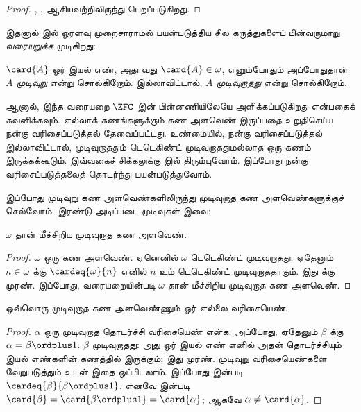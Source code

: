 \documentclass[../../../include/open-logic-section]{subfiles}
\begin{document}
\begin{proof}
,
,
 ஆகியவற்றிலிருந்து பெறப்படுகிறது.
\end{proof}

இதனால்  இல் ஓரளவு முறைசாராமல் பயன்படுத்திய
சில கருத்துகளைப் பின்வருமாறு \emph{வரையறுக்க} முடிகிறது:

\begin{defn}
$\card{A}$ ஓர் இயல் எண், அதாவது $\card{A} \in \omega$,
எனும்போதும் அப்போதுதான் $A$ \emph{முடிவுறு} என்று சொல்கிறோம்.
இல்லாவிட்டால், $A$ \emph{முடிவுறாதது} என்று சொல்கிறோம்.
\end{defn}
\noindent
ஆனால், இந்த வரையறை $\ZFC$ இன் பின்னணியிலேயே அளிக்கப்படுகிறது
என்பதைக் கவனிக்கவும். எல்லாக் கணங்களுக்கும் கண அளவெண் இருப்பதை
உறுதிசெய்ய நன்கு வரிசைப்படுத்தல் தேவைப்பட்டது. உண்மையில், நன்கு
வரிசைப்படுத்தல் இல்லாவிட்டால், முடிவுறாததும் டெடெகிண்ட்
முடிவுறாததுமல்லாத ஒரு கணம் இருக்கக்கூடும். இவ்வகைச் சிக்கலுக்கு
 இல் திரும்புவோம். இப்போது நன்கு
வரிசைப்படுத்தலைத் தொடர்ந்து பயன்படுத்துவோம்.

இப்போது முடிவுறு கண அளவெண்களிலிருந்து முடிவுறாத கண அளவெண்களுக்குச்
செல்வோம். இரண்டு அடிப்படை முடிவுகள் இவை:

\begin{cor}
$\omega$ தான் மீச்சிறிய முடிவுறாத கண அளவெண்.
\end{cor}

\begin{proof}
$\omega$ ஒரு கண அளவெண். ஏனெனில் $\omega$ டெடெகிண்ட்
முடிவுறாதது; ஏதேனும் $n \in \omega$ க்கு
$\cardeq{\omega}{n}$ எனில் $n$ உம் டெடெகிண்ட் முடிவுறாததாகும்.
இது  க்கு முரண்.
இப்போது, வரையறையின்படி $\omega$ தான் மீச்சிறிய முடிவுறாத கண அளவெண்.
\end{proof}

\begin{cor}
ஒவ்வொரு முடிவுறாத கண அளவெண்ணும் ஓர் எல்லை வரிசையெண்.
\end{cor}

\begin{proof}
$\alpha$ ஒரு முடிவுறாத தொடர்ச்சி வரிசையெண் என்க. அப்போது,
ஏதேனும் $\beta$ க்கு $\alpha = \beta \ordplus 1$.
$\beta$ முடிவுறாதது: அது ஓர் இயல் எண் எனில் அதன்
தொடர்ச்சியும் இயல் எண்களின் கணத்தில் இருக்கும்; இது முரண். முடிவுறு
வரிசையெண்களை வேறுபடுத்தும்  உடன் இதை
ஒப்பிடலாம். இப்போது
 இன்படி
$\cardeq{\beta}{\beta \ordplus 1}$. எனவே
 இன்படி
$\card{\beta} = \card{\beta\ordplus 1} = \card{\alpha}$;
ஆகவே $\alpha \neq \card{\alpha}$.
\end{proof}
\end{document}
